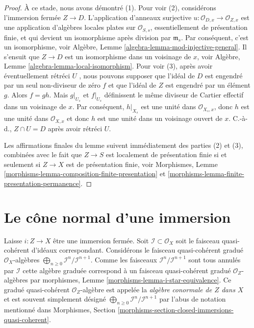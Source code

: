 \begin{proof}
\medskip\noindent
À ce stade, nous avons démontré (1). Pour voir (2), considérons l'immersion fermée
 $Z \to D$. L'application d'anneaux surjective  $u : \mathcal{O}_{D, x} \to \mathcal{O}_{Z, x}$  est une application
d'algèbres locales plates sur  $\mathcal{O}_{S, s}$, essentiellement de présentation finie,
et qui devient un isomorphisme après division par  $\mathfrak m_s$. Par conséquent,
c'est un isomorphisme, voir Algèbre, Lemme  \ref{algebra-lemma-mod-injective-general}. Il s'ensuit que
 $Z \to D$  est un isomorphisme dans un voisinage de  $x$, voir Algèbre,
Lemme  \ref{algebra-lemma-local-isomorphism}. Pour voir (3), après avoir éventuellement rétréci
 $U$ , nous pouvons supposer que l'idéal de  $D$  est engendré par
un seul non-diviseur de zéro  $f$  et que l'idéal de  $Z$  est
engendré par un élément  $g$. Alors  $f = gh$. Mais  $g|_{U_s}$  et
 $f|_{U_s}$  définissent le même diviseur de Cartier effectif dans un voisinage de
 $x$. Par conséquent,  $h|_{X_s}$  est une unité dans  $\mathcal{O}_{X_s, x}$, donc
 $h$  est une unité dans  $\mathcal{O}_{X, x}$  et donc  $h$  est une unité
dans un voisinage ouvert de  $x$. C.-à-d.,  $Z \cap U = D$  après avoir
rétréci  $U$.

\medskip\noindent
Les affirmations finales du lemme suivent immédiatement des parties (2) et (3),
combinées avec le fait que  $Z \to S$  est localement de présentation finie si et
seulement si  $Z \to X$  est de présentation finie, voir Morphismes, Lemme
 \ref{morphisms-lemma-composition-finite-presentation}  et  \ref{morphisms-lemma-finite-presentation-permanence}.
\end{proof}



\section{Le cône normal d'une immersion}
\label{section-normal-cone}

\noindent
Laisse $i : Z \to X$ être une immersion fermée. Soit $\mathcal{I} \subset \mathcal{O}_X$ soit le faisceau
quasi-cohérent d'idéaux correspondant. Considérons le faisceau quasi-cohérent
gradué $\mathcal{O}_X$-algèbres $\bigoplus_{n \geq 0} \mathcal{I}^n/\mathcal{I}^{n + 1}$. Comme les faisceaux $\mathcal{I}^n/\mathcal{I}^{n + 1}$ sont tous
annulés par $\mathcal{I}$ cette algèbre graduée correspond à un faisceau
quasi-cohérent gradué $\mathcal{O}_Z$-algèbres par morphismes, Lemme \ref{morphisms-lemma-i-star-equivalence}. Ce
gradué quasi-cohérent $\mathcal{O}_Z$-algèbre est appelée la
 {\it algèbre conormale
de $Z$ dans $X$}  et est souvent simplement désigné
 $\bigoplus_{n \geq 0} \mathcal{I}^n/\mathcal{I}^{n + 1}$ par l'abus de notation mentionné dans Morphismes, Section \ref{morphisms-section-closed-immersions-quasi-coherent}.

